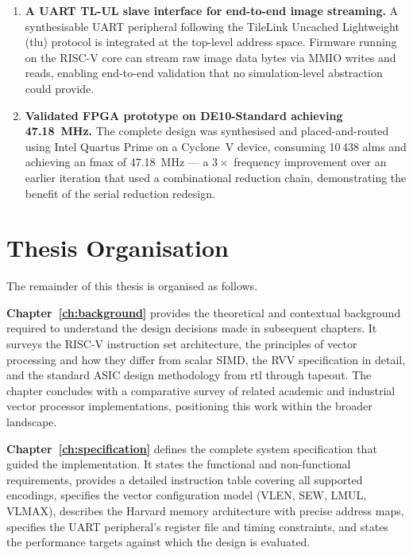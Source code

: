 \begin{enumerate}[label=\arabic*.]
  \item \textbf{A UART TL-UL slave interface for end-to-end image streaming.}
        A synthesisable UART peripheral following the TileLink Uncached Lightweight
        (\gls{tlu}) protocol is integrated at the top-level address space.
        Firmware running on the RISC-V core can stream raw image data bytes via
        MMIO writes and reads, enabling end-to-end validation that no simulation-level
        abstraction could provide.

  \item \textbf{Validated FPGA prototype on DE10-Standard achieving 47.18~MHz.}
        The complete design was synthesised and placed-and-routed using Intel Quartus
        Prime on a Cyclone~V device, consuming 10\,438 \glspl{alm} and achieving an
        \gls{fmax} of 47.18~MHz --- a $3\times$ frequency improvement over an earlier
        iteration that used a combinational reduction chain, demonstrating the benefit
        of the serial reduction redesign.
\end{enumerate}

\section{Thesis Organisation}
\label{sec:organisation}

The remainder of this thesis is organised as follows.

\textbf{Chapter~\ref{ch:background}} provides the theoretical and contextual background
required to understand the design decisions made in subsequent chapters. It surveys
the RISC-V instruction set architecture, the principles of vector processing and how
they differ from scalar SIMD, the RVV specification in detail, and the standard ASIC
design methodology from \gls{rtl} through tapeout. The chapter concludes with a
comparative survey of related academic and industrial vector processor implementations,
positioning this work within the broader landscape.

\textbf{Chapter~\ref{ch:specification}} defines the complete system specification that
guided the implementation. It states the functional and non-functional requirements,
provides a detailed instruction table covering all supported encodings, specifies the
vector configuration model (VLEN, SEW, LMUL, VLMAX), describes the Harvard memory
architecture with precise address maps, specifies the UART peripheral's register file
and timing constraints, and states the performance targets against which the design
is evaluated.

